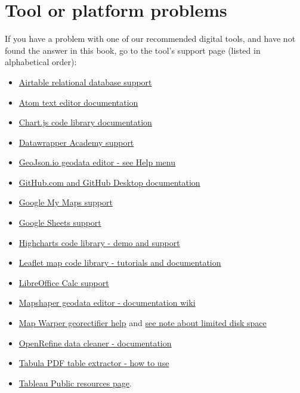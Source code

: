 \documentclass[
  english,
]{book}
\providecommand{\tightlist}{%
  \setlength{\itemsep}{0pt}\setlength{\parskip}{0pt}}
\begin{document}
\hypertarget{fix-tool}{%
\section{Tool or platform problems}\label{fix-tool}}

If you have a problem with one of our recommended digital tools, and have not found the answer in this book, go to the tool's support page (listed in alphabetical order):

\begin{itemize}
\tightlist
\item
  \href{https://support.airtable.com}{Airtable relational database support}
\item
  \href{https://atom.io/docs}{Atom text editor documentation}
\item
  \href{https://www.chartjs.org/}{Chart.js code library documentation}
\item
  \href{https://academy.datawrapper.de/}{Datawrapper Academy support}
\item
  \href{https://geojson.io/}{GeoJson.io geodata editor - see Help menu}
\item
  \href{https://docs.github.com}{GitHub.com and GitHub Desktop documentation}
\item
  \href{https://support.google.com/mymaps}{Google My Maps support}
\item
  \href{https://support.google.com/docs}{Google Sheets support}
\item
  \href{https://www.highcharts.com}{Highcharts code library - demo and support}
\item
  \href{https://leafletjs.com}{Leaflet map code library - tutorials and documentation}
\item
  \href{https://help.libreoffice.org}{LibreOffice Calc support}
\item
  \href{https://github.com/mbloch/mapshaper/wiki/Command-Reference}{Mapshaper geodata editor - documentation wiki}
\item
  \href{https://mapwarper.net/help}{Map Warper georectifier help} and \href{https://mapwarper.net}{see note about limited disk space}
\item
  \href{https://openrefine.org}{OpenRefine data cleaner - documentation}
\item
  \href{https://tabula.technology}{Tabula PDF table extractor - how to use}
\item
  \href{https://public.tableau.com/en-us/s/resources}{Tableau Public resources page}.
\end{itemize}
\end{document}
